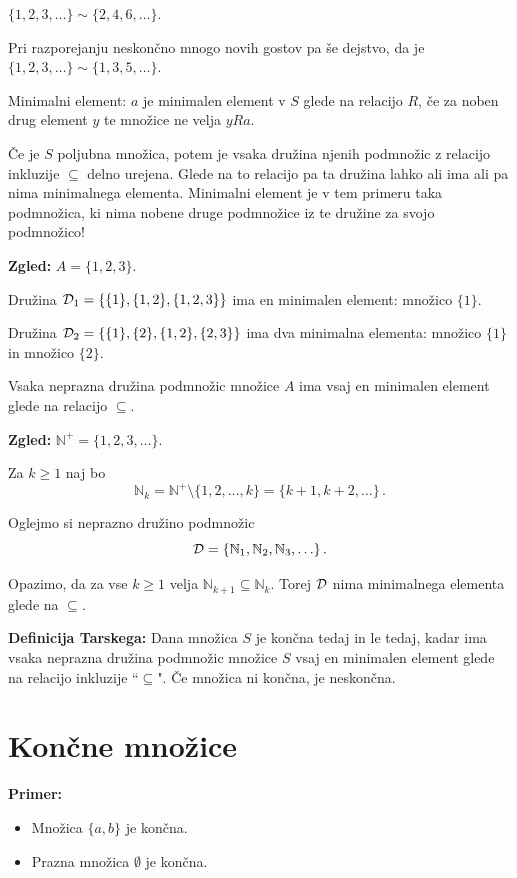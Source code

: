 \documentclass[11pt,paper=b5,DIV=13,headinclude,footinclude]{scrbook}
\begin{document}
\begin{description}
  $\{1,2,3,\ldots\}\sim\{2,4,6,\ldots\}$.

  Pri razporejanju neskončno mnogo novih gostov pa še dejstvo, da je
  $\{1,2,3,\ldots\}\sim \{1,3,5,\ldots\}$.
  \item[(Tarski.)] Minimalni element: $a$ je minimalen element v $S$ glede na relacijo $R$, če za noben drug element $y$ te množice ne velja $yRa$.

      Če je $S$ poljubna množica, potem je vsaka družina njenih podmnožic z relacijo inkluzije $\subseteq$ delno urejena. Glede na to relacijo pa ta družina lahko ali ima ali pa nima minimalnega elementa. Minimalni element je v tem primeru taka podmnožica, ki nima nobene druge podmnožice iz te družine za svojo podmnožico!

      \textbf{Zgled:} $A = \{1,2,3\}$.

      Družina ${\cal D}_1 = \{\{1\}, \{1,2\}, \{1,2,3\}\}$ ima en minimalen element: množico $\{1\}$.

      Družina ${\cal D}_2 = \{\{1\}, \{2\}, \{1,2\}, \{2,3\}\}$ ima dva minimalna elementa: množico $\{1\}$ in množico $\{2\}$.

      Vsaka neprazna družina podmnožic množice $A$ ima vsaj en minimalen element glede na relacijo $\subseteq$.

      \textbf{Zgled:} $\mathbb{N}^+ = \{1,2,3,\ldots\}$.

      Za $k\ge 1$ naj bo $$\mathbb{N}_k = \mathbb{N}^+\setminus\{1,2,\ldots, k\}= \{k+1,k+2,\ldots\}\,.$$

      Oglejmo si neprazno družino podmnožic
      $${\cal D} = \{\mathbb{N}_1,\mathbb{N}_2, \mathbb{N}_3,\ldots\}\,.$$

      Opazimo, da za vse $k\ge 1$ velja $\mathbb{N}_{k+1}\subseteq \mathbb{N}_k$. Torej ${\cal D}$ nima minimalnega elementa glede na $\subseteq$.

      \medskip
      \textbf{Definicija Tarskega:}
      Dana množica $S$ je končna tedaj in le tedaj, kadar ima vsaka neprazna družina podmnožic množice $S$ vsaj en minimalen element glede na relacijo inkluzije ``$\subseteq$". Če množica ni končna, je neskončna.
\end{description}

\section{Končne množice}
\textbf{Primer:}
\begin{itemize}
  \item Množica $\{a,b\}$ je končna.
  \item Prazna množica $\emptyset$ je končna.
\end{itemize}
\end{document}
